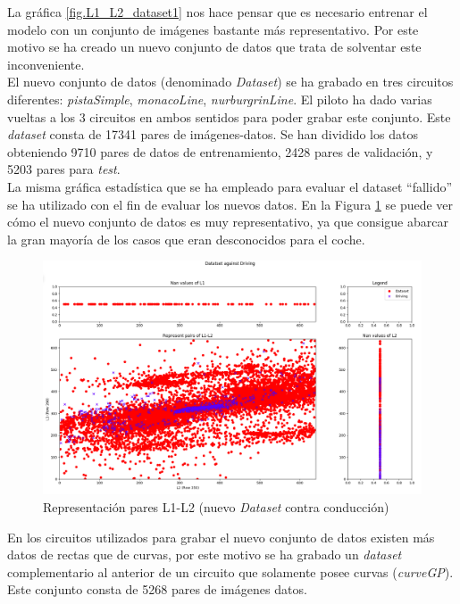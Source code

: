 La gráfica \ref{fig.L1_L2_dataset1} nos hace pensar que es necesario entrenar el modelo con un conjunto de imágenes bastante más representativo. Por este motivo se ha creado un nuevo conjunto de datos que trata de solventar este inconveniente.\\

El nuevo conjunto de datos (denominado \textit{Dataset}) se ha grabado en tres circuitos diferentes: \textit{pistaSimple}, \textit{monacoLine}, \textit{nurburgrinLine}. El piloto ha dado varias vueltas a los 3 circuitos en ambos sentidos para poder grabar este conjunto. Este \textit{dataset} consta de 17341 pares de imágenes-datos. Se han dividido los datos obteniendo 9710 pares de datos de entrenamiento, 2428 pares de validación, y 5203 pares para \textit{test}.\\

La misma gráfica estadística que se ha empleado para evaluar el dataset ``fallido'' se ha utilizado con el fin de evaluar los nuevos datos. En la Figura \ref{fig.L1_L2_dataset3} se puede ver cómo el nuevo conjunto de datos es muy representativo, ya que consigue abarcar la gran mayoría de los casos que eran desconocidos para el coche.\\

\begin{figure}
  \begin{center}
    \includegraphics[width=1\textwidth]{figures/Infraestructura/L1_L2_Dataset3.png}
		\caption{Representación pares L1-L2 (nuevo \textit{Dataset} contra conducción)}
		\label{fig.L1_L2_dataset3}
		\end{center}
\end{figure}

En los circuitos utilizados para grabar el nuevo conjunto de datos existen más datos de rectas que de curvas, por este motivo se ha grabado un \textit{dataset} complementario al anterior de un circuito que solamente posee curvas (\textit{curveGP}). Este conjunto consta de 5268 pares de imágenes datos.\\


